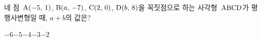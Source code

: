 네 점~$\mathrm{A}(-5,\,1)$, $\mathrm{B}(a,\,-7)$, $\mathrm{C}(2,\,0)$, $\mathrm{D}(b,\,8)$을 꼭짓점으로 하는 사각형~$\mathrm{ABCD}$가 평행사변형일 때, $a+b$의 값은?
\begin{choices32}{$-6$}{$-5$}{$-4$}{$-3$}{$-2$}\end{choices32}
